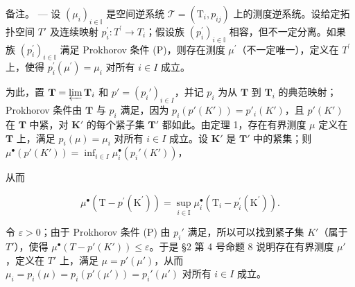 备注。 --- 设 \((\mu_{i})_{i\in\mathbb{I}}\) 是空间逆系统 \(\mathcal{T}=(\mathrm{T}_{i},p_{ij})\) 上的测度逆系统。设给定拓扑空间 \(T'\) 及连续映射 \(p_{i}^{\prime}:T^{\prime}\to T_{i}\)；假设族 \((p_{i}^{\prime})_{i\in\mathbb{I}}\) 相容，但不一定分离。如果族 \((p_{i}^{\prime})_{i\in\mathbb{I}}\) 满足 Prokhorov 条件 (P)，则存在测度 \(\mu^{\prime}\)（不一定唯一），定义在 \(T^{\prime}\) 上，使得 \(p_{i}^{\prime}(\mu^{\prime})=\mu_{i}\) 对所有 \(i\in I\) 成立。

为此，置 \(\mathbf{T} = \varprojlim \mathbf{T}_i\) 和 \(p' = (p_i')_{i\in I}\)，并记 \(p_i\) 为从 \(\mathbf{T}\) 到 \(\mathbf{T}_i\) 的典范映射；Prokhorov 条件由 \(\mathbf{T}\) 与 \(p_i\) 满足，因为 \(p_i(p'(K')) = p'_i(K')\)，且 \(p'(K')\) 在 \(\mathbf{T}\) 中紧，对 \(\mathbf{K}'\) 的每个紧子集 \(\mathbf{T}'\) 都如此。由定理 1，存在有界测度 \(\mu\) 定义在 \(\mathbf{T}\) 上，满足 \(p_i(\mu) = \mu_i\) 对所有 \(i\in I\) 成立。设 \(\mathbf{K}'\) 是 \(\mathbf{T}'\) 中的紧集；则 \(\mu^\bullet (p'(K')) = \inf_{i\in I}\mu_i^\bullet (p_i'(K'))\)，

从而

\[
\mu^ {\bullet} \left(\mathrm{T} - p ^ {\prime} \left(\mathrm{K} ^ {\prime}\right)\right) = \sup _ {i \in \mathrm{I}} \mu_ {i} ^ {\bullet} \left(\mathrm{T} _ {i} - p _ {i} ^ {\prime} \left(\mathrm{K} ^ {\prime}\right)\right).
\]

令 \(\varepsilon > 0\)；由于 Prokhorov 条件 (P) 由 \(p_i'\) 满足，所以可以找到紧子集 \(K'\)（属于 \(T'\)），使得 \(\mu^\bullet(T - p'(K')) \leqslant \varepsilon\)。于是 §2 第 4 号命题 8 说明存在有界测度 \(\mu'\)，定义在 \(T'\) 上，满足 \(\mu = p'(\mu')\)，从而 \(\mu_i = p_i(\mu) = p_i(p'(\mu')) = p_i'(\mu')\) 对所有 \(i \in I\) 成立。

